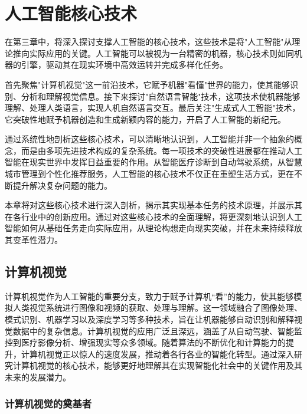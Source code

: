 \chapter{人工智能核心技术}

在第三章中，将深入探讨支撑人工智能的核心技术，这些技术是将"人工智能"从理论推向实际应用的关键。人工智能可以被视为一台精密的机器，核心技术则如同机器的引擎，驱动其在现实环境中高效运转并完成多样化任务。

首先聚焦"计算机视觉"这一前沿技术，它赋予机器"看懂"世界的能力，使其能够识别、分析和理解视觉信息。接下来探讨"自然语言智能"技术，这项技术使机器能够理解、处理人类语言，实现人机自然语言交互。最后关注"生成式人工智能"技术，它突破性地赋予机器创造和生成新颖内容的能力，开启了人工智能的新纪元。

通过系统性地剖析这些核心技术，可以清晰地认识到，人工智能并非一个抽象的概念，而是由多项先进技术构成的复杂系统。每一项技术的突破性进展都在推动人工智能在现实世界中发挥日益重要的作用。从智能医疗诊断到自动驾驶系统，从智慧城市管理到个性化推荐服务，人工智能的核心技术不仅正在重塑生活方式，更在不断提升解决复杂问题的能力。

本章将对这些核心技术进行深入剖析，揭示其实现基本任务的技术原理，并展示其在各行业中的创新应用。通过对这些核心技术的全面理解，将更深刻地认识到人工智能如何从基础任务走向实际应用，从理论构想走向现实突破，并在未来持续释放其变革性潜力。

\section{计算机视觉}

计算机视觉作为人工智能的重要分支，致力于赋予计算机“看”的能力，使其能够模拟人类视觉系统进行图像和视频的获取、处理与理解。这一领域融合了图像处理、模式识别、机器学习以及深度学习等多种技术，旨在让机器能够自动识别和解释视觉数据中的复杂信息。计算机视觉的应用广泛且深远，涵盖了从自动驾驶、智能监控到医疗影像分析、增强现实等众多领域。随着算法的不断优化和计算能力的提升，计算机视觉正以惊人的速度发展，推动着各行各业的智能化转型。通过深入研究计算机视觉的核心技术，能够更好地理解其在实现智能化社会中的关键作用及其未来的发展潜力。

\subsection{计算机视觉的奠基者}

